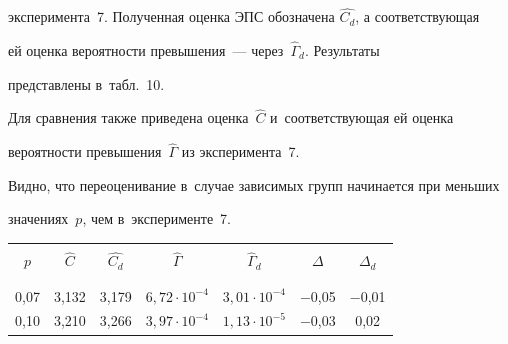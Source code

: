 эксперимента~7. Полученная оценка ЭПС обозначена $\hat{C_d}$, а соответствующая 


ей оценка вероятности превышения~--- через~${\hat\Gamma}_{d}$.  Результаты 


представлены в~табл.~10.


 Для сравнения   также приведена  оценка~$\hat{C}$ и~соответствующая ей оценка 


вероятности превышения~$\hat{\Gamma}$ из  эксперимента~7.


 Видно, что переоценивание в~случае зависимых  групп  начинается при  меньших 


значениях~$p$, чем в~эксперименте~7.





\begin{table}[h]\small %


\vspace*{-6pt}


\begin{center}




\vspace*{2ex}





\tabcolsep=6.5pt


\begin{tabular}{|c|c|c|c|c|c|c|}


\hline


&&&&&&\\[-9pt]


$p$& $\hat{C}$ & $\hat{C_d}$ &$\hat\Gamma$ & ${\hat\Gamma}_{d}$ & $\Delta$& 


${\Delta}_d$   \\ 


&&&&&&\\[-9pt]


\hline


&&&&&&\\[-9pt]


0,07& 3,132 & 3,179 & $ 6{,}72 \cdot 10^{-4}$& $3{,}01 \cdot 10^{-4}$ &$-$0,05   &$-$0,01\hphantom{$-$}   \\




0,10& 3,210 & 3,266& $ 3{,}97 \cdot 10^{-4} $& $ 1{,}13\cdot 10^{-5}$ &$-$0,03 &  0,02 \\



\end{tabular}
\end{center}
\end{table}
